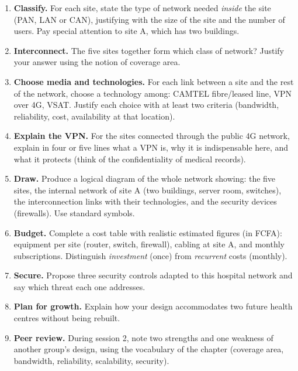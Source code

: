 \documentclass[11pt]{article}
\begin{document}
\begin{enumerate}
\item \textbf{Classify.} For each site, state the type of network needed \emph{inside} the site (PAN, LAN or CAN), justifying with the size of the site and the number of users. Pay special attention to site A, which has two buildings.
\item \textbf{Interconnect.} The five sites together form which class of network? Justify your answer using the notion of coverage area.
\item \textbf{Choose media and technologies.} For each link between a site and the rest of the network, choose a technology among: CAMTEL fibre/leased line, VPN over 4G, VSAT. Justify each choice with at least two criteria (bandwidth, reliability, cost, availability at that location).
\item \textbf{Explain the VPN.} For the sites connected through the public 4G network, explain in four or five lines what a VPN is, why it is indispensable here, and what it protects (think of the confidentiality of medical records).
\item \textbf{Draw.} Produce a logical diagram of the whole network showing: the five sites, the internal network of site A (two buildings, server room, switches), the interconnection links with their technologies, and the security devices (firewalls). Use standard symbols.
\item \textbf{Budget.} Complete a cost table with realistic estimated figures (in FCFA): equipment per site (router, switch, firewall), cabling at site A, and monthly subscriptions. Distinguish \emph{investment} (once) from \emph{recurrent} costs (monthly).
\item \textbf{Secure.} Propose three security controls adapted to this hospital network and say which threat each one addresses.
\item \textbf{Plan for growth.} Explain how your design accommodates two future health centres without being rebuilt.
\item \textbf{Peer review.} During session 2, note two strengths and one weakness of another group's design, using the vocabulary of the chapter (coverage area, bandwidth, reliability, scalability, security).
\end{enumerate}
\end{document}
